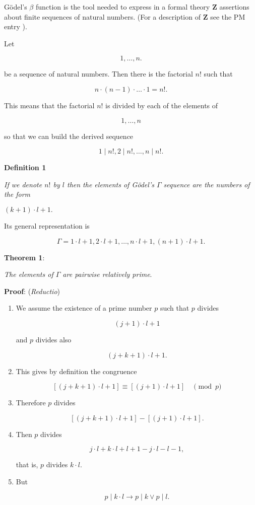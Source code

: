 \documentclass[12pt]{article}
\begin{document}
G\"{o}del's $\beta$ function is the tool needed to express in a formal theory \textbf{Z} assertions  about finite sequences of natural  numbers. (For a description of \textbf{Z} see the PM entry ). 

Let 

$$1, \ldots, n.$$

be a sequence of natural numbers. Then there is the factorial $n!$ such that

$$n \cdot (n - 1) \cdot \ldots \cdot 1 = n!.$$

This means that the factorial $n!$ is divided by each of the elements of
 
$$1, \ldots, n$$

so that we can build the derived sequence

$$ {1}\mid{n!}, {2}\mid{n!}, \ldots, {n}\mid{n!}.$$

\textbf{Definition 1}  
         
\begin{center}
\emph{If we denote $n!$ by $l$ then the elements of G\"{o}del's $\Gamma$ sequence are the numbers of the form}

$(k + 1) \cdot l + 1.$
\end{center}

Its general representation is
 
$$\Gamma = 1 \cdot l + 1, 2 \cdot l + 1, \ldots, n \cdot l + 1, (n + 1) \cdot l + 1.$$ 

\textbf{Theorem 1}:

\begin{center}
\emph{The elements of $\Gamma$ are pairwise relatively prime}.
\end{center}

\textbf{Proof}: (\emph{Reductio}) 

\begin{enumerate}
\item We assume the existence of a prime number $p$ such that $p$ divides

$$(j + 1) \cdot l + 1$$ 

and $p$ divides also 

$$(j + k + 1) \cdot l + 1.$$

\item This gives by definition the congruence

$$[(j + k + 1) \cdot l + 1] \equiv [(j + 1) \cdot l + 1] \quad \pmod{p}$$

\item Therefore $p$ divides

$$[(j + k + 1) \cdot l + 1] - [(j + 1) \cdot l + 1].$$

\item Then $p$ divides

$$j \cdot l + k \cdot l + l + 1 - j \cdot l - l - 1,$$

that is, $p$ divides $k \cdot l$.

\item But
  
$$ {p}\mid{k \cdot l} \rightarrow {p}\mid{k} \vee {p}\mid{l}.$$
\end{enumerate}
\end{document}
